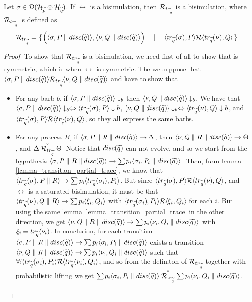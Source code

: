 \newcommand{\relTrQ}{\rel_{\trQ}}
\begin{lemma}\label{lemma_reltrq_probabilistic}
Let $\sigma \in \mathcal{D}(\mathcal{H}_{\widetilde{p}} \otimes \mathcal{H}_{\widetilde{q}})$. If $\rel$ is a bisimulation, then $\mathcal{R}_{tr_{\widetilde{q}}}$ is a bisimulation, where $\mathcal{R}_{tr_{\widetilde{q}}}$ is defined as
\[\mathcal{R}_{tr_{\widetilde{q}}} = \set{\Big(\langle\sigma, P \parallel disc(\widetilde{q})\rangle, \langle\nu, Q \parallel disc(\widetilde{q})\rangle\Big) \quad\mid\quad \langle tr_{\widetilde{q}}(\sigma), P\rangle \mathcal{R}\langle tr_{\widetilde{q}}(\nu), Q\rangle}\]
\end{lemma}
\begin{proof}
To show that $\mathcal{R}_{tr_{\widetilde{q}}}$ is a bisimulation, we need first of all to show that is symmetric, which is when $\rel$ is symmetric. The we suppose that $\confw{\sigma, P \parallel \discQ} \relTrQ \confw{\nu, Q \parallel \discQ}$ and have to show that \begin{itemize}
\item For any barb $b$, if $\langle\sigma, P \parallel disc(\widetilde{q})\rangle \downarrow_b$ then $\langle\nu, Q \parallel disc(\widetilde{q})\rangle \downarrow_b$. We have that $\langle\sigma, P \parallel disc(\widetilde{q})\rangle \downarrow_b \Leftrightarrow \langle tr_{\widetilde{q}}(\sigma), P\rangle \downarrow b$, $\langle\nu, Q \parallel disc(\widetilde{q})\rangle \downarrow_b \Leftrightarrow \langle tr_{\widetilde{q}}(\nu), Q\rangle \downarrow b$, and 
$\langle tr_{\widetilde{q}}(\sigma), P\rangle \mathcal{R} \langle tr_{\widetilde{q}}(\nu), Q\rangle$, so they all express the same barbs.
\item For any process $R$, if $\langle\sigma, P \parallel R \parallel disc(\widetilde{q})\rangle \rightarrow \Delta$, then $\langle\nu, Q \parallel R \parallel disc(\widetilde{q})\rangle \rightarrow \Theta$, and $\Delta \slift{\relTrQ} \Theta$. Notice that $disc(\widetilde{q})$ can not evolve, and so we start from the hypothesis $\langle\sigma, P \parallel R \parallel disc(\widetilde{q})\rangle \rightarrow \sum p_i \langle\sigma_i, P_i \parallel disc(\widetilde{q})\rangle$. Then, from lemma \ref{lemma_transition_partial_trace}, we know that $\langle tr_{\widetilde{q}}(\sigma), P\parallel R\rangle \rightarrow \sum p_i \langle tr_{\widetilde{q}}(\sigma_i), P_i\rangle$. But since $\langle tr_{\widetilde{q}}(\sigma), P\rangle \mathcal{R} \langle tr_{\widetilde{q}}(\nu), Q\rangle$, and $\rel$ is a saturated bisimulation, it must be that $\langle tr_{\widetilde{q}}(\nu), Q\parallel R\rangle \rightarrow \sum p_i \langle\xi_i, Q_i\rangle$ with $\langle tr_{\widetilde{q}}(\sigma_i), P_i\rangle \mathcal{R} \langle\xi_i, Q_i\rangle$ for each $i$. But using the same lemma \ref{lemma_transition_partial_trace} in the other direction, we get $\langle\nu, Q \parallel R \parallel disc(\widetilde{q})\rangle \rightarrow \sum p_i \langle\nu_i, Q_i \parallel disc(\widetilde{q})\rangle$ with $\xi_i = tr_{\widetilde{q}}(\nu_i)$. In conclusion, for each transition $\langle\sigma, P \parallel R \parallel disc(\widetilde{q})\rangle \rightarrow \sum p_i \langle\sigma_i, P_i \parallel disc(\widetilde{q})\rangle$ exists a transition $\langle\nu, Q \parallel R \parallel disc(\widetilde{q})\rangle \rightarrow \sum p_i \langle\nu_i, Q_i \parallel disc(\widetilde{q})\rangle$ such that $\forall i \langle tr_{\widetilde{q}}(\sigma_i), P_i\rangle \mathcal{R} \langle tr_{\widetilde{q}}(\nu_i), Q_i\rangle$, and so from the definiton of $\relTrQ$ together with probabilistic lifting we get $\sum p_i \confw{\sigma_i, P_i \parallel \discQ} \slift{\relTrQ} \sum p_i \confw{\nu_i, Q_i \parallel \discQ}$.
\end{itemize}
\end{proof}

